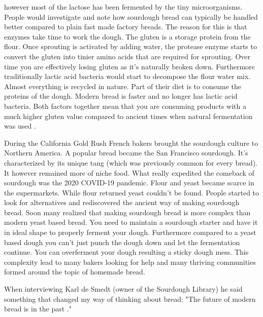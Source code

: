 however most of the lactose has been fermented by
the tiny microorganisms. People would investigate and
note how sourdough bread can typically be handled better
compared to plain fast made factory breads. The
reason for this is that enzymes take time to work the dough.
The gluten is a storage protein from the flour. Once
sprouting is activated by adding water, the protease
enzyme starts to convert the gluten into tinier amino acids
that are required for sprouting. Over time you are effectively
losing gluten as it's naturally broken down. Furthermore
traditionally lactic acid bacteria would start to decompose
the flour water mix. Almost everything is recycled in nature.
Part of their diet is to consume the proteins of the dough.
Modern bread is faster and no longer has lactic acid bacteria.
Both factors together mean that you are consuming products
with a much higher gluten value compared to ancient times
when natural fermentation was used \cite{raffaella+di+cagno}.

During the California Gold Rush French bakers brought the sourdough
culture to Northern America. A popular bread became the
San Francisco sourdough. It's characterized by its unique
tang (which was previously common for every bread). It
however remained more of niche food. What really expedited
the comeback of sourdough was the 2020 COVID-19 pandemic.
Flour and yeast became scarce in the supermarkets. While
flour returned yeast couldn't be found. People started
to look for alternatives and rediscovered the ancient
way of making sourdough bread. Soon many realized
that making sourdough bread is more complex than modern
yeast based bread. You need to maintain a sourdough starter
and have it in ideal shape to properly ferment your dough.
Furthermore compared to a yeast based dough you can't just
punch the dough down and let the fermentation continue.
You can overferment your dough resulting a sticky
dough mess. This complexity lead to many bakers looking
for help and many thriving communities formed around
the topic of homemade bread.

When interviewing Karl de Smedt (owner of the Sourdough
Library) he said something that changed my way of thinking
about bread: "The future of
modern bread is in the past \cite{interview+karl+de+smedt}."
